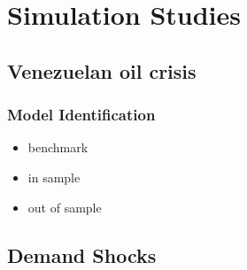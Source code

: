 

\section{Simulation Studies}
\label{sec: sim}
\subsection{Venezuelan oil crisis}

\subsubsection{Model Identification}


\begin{itemize}
    \item benchmark
    \item in sample
    \item out of sample
\end{itemize}


\subsection{Demand Shocks}

